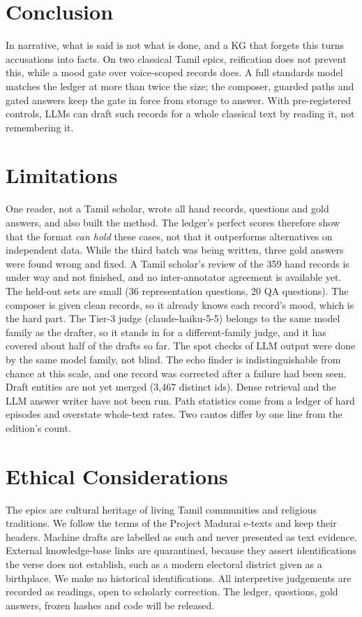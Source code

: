 \documentclass[11pt]{article}
\begin{document}
\section{Conclusion}
In narrative, what is said is not what is done, and a KG that forgets this turns accusations into facts. On two classical Tamil epics, reification does not prevent this, while a mood gate over voice-scoped records does. A full standards model matches the ledger at more than twice the size; the composer, guarded paths and gated answers keep the gate in force from storage to answer. With pre-registered controls, LLMs can draft such records for a whole classical text by reading it, not remembering it.

\section*{Limitations}
One reader, not a Tamil scholar, wrote all hand records, questions and gold answers, and also built the method. The ledger's perfect scores therefore show that the format \emph{can hold} these cases, not that it outperforms alternatives on independent data. While the third batch was being written, three gold answers were found wrong and fixed. A Tamil scholar's review of the 359 hand records is under way and not finished, and no inter-annotator agreement is available yet. The held-out sets are small (36 representation questions, 20 QA questions). The composer is given clean records, so it already knows each record's mood, which is the hard part. The Tier-3 judge (claude-haiku-5-5) belongs to the same model family as the drafter, so it stands in for a different-family judge, and it has covered about half of the drafts so far. The spot checks of LLM output were done by the same model family, not blind. The echo finder is indistinguishable from chance at this scale, and one record was corrected after a failure had been seen. Draft entities are not yet merged (3,467 distinct ids). Dense retrieval and the LLM answer writer have not been run. Path statistics come from a ledger of hard episodes and overstate whole-text rates. Two cantos differ by one line from the edition's count.

\section*{Ethical Considerations}
The epics are cultural heritage of living Tamil communities and religious traditions. We follow the terms of the Project Madurai e-texts and keep their headers. Machine drafts are labelled as such and never presented as text evidence. External knowledge-base links are quarantined, because they assert identifications the verse does not establish, such as a modern electoral district given as a birthplace. We make no historical identifications. All interpretive judgements are recorded as readings, open to scholarly correction. The ledger, questions, gold answers, frozen hashes and code will be released.
\end{document}
